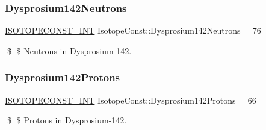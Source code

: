 \subsubsection{\texorpdfstring{Dysprosium142\+Neutrons}{Dysprosium142Neutrons}}
{\footnotesize\ttfamily \mbox{\hyperlink{group___isotope_const-_macros_ga5f18360b3e99483a35c32d789e62621c}{I\+S\+O\+T\+O\+P\+E\+C\+O\+N\+S\+T\+\_\+\+I\+NT}} Isotope\+Const\+::\+Dysprosium142\+Neutrons = 76}

\$ \$ Neutrons in Dysprosium-\/142. \mbox{\label{group___isotope_const-_dysprosium-_dy142_gad5f4d7544ee65a28f4c4e814821981a5}} 
\subsubsection{\texorpdfstring{Dysprosium142\+Protons}{Dysprosium142Protons}}
{\footnotesize\ttfamily \mbox{\hyperlink{group___isotope_const-_macros_ga5f18360b3e99483a35c32d789e62621c}{I\+S\+O\+T\+O\+P\+E\+C\+O\+N\+S\+T\+\_\+\+I\+NT}} Isotope\+Const\+::\+Dysprosium142\+Protons = 66}

\$ \$ Protons in Dysprosium-\/142. 